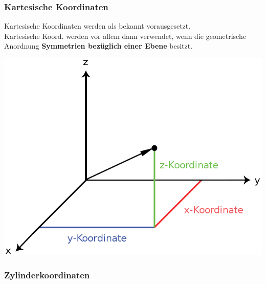 	\subsubsection{Kartesische Koordinaten}

	 {}
	\beginip
	Kartesische Koordinaten werden als bekannt vorausgesetzt. \\
	Kartesische Koord. werden vor allem dann verwendet, wenn die geometrische Anordnung \textbf{Symmetrien bezüglich einer Ebene} besitzt.
	\begin{center}
		\includegraphics[scale=0.3]{img/cartesian.png}
	\end{center}
	\iend

	\newpage

	\subsubsection{Zylinderkoordinaten}

